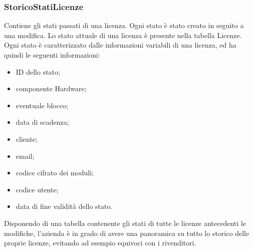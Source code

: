 \subsubsection{StoricoStatiLicenze}

Contiene gli stati passati di una licenza. Ogni stato è stato creato in seguito a una modifica. Lo stato attuale di una licenza è presente nella tabella Licenze.
\\Ogni stato è caratterizzato dalle informazioni variabili di una licenza, ed ha quindi le seguenti informazioni:

\begin{itemize}
\item ID dello stato;
\item componente Hardware;
\item eventuale blocco;
\item data di scadenza;
\item cliente;
\item email;
\item codice cifrato dei moduli;
\item codice utente;
\item data di fine validità dello stato.
\end{itemize}

Disponendo di una tabella contenente gli stati di tutte le licenze antecedenti le modifiche, l'azienda è in grado di avere una panoramica su tutto lo storico delle proprie licenze, evitando ad esempio equivoci con i rivenditori.